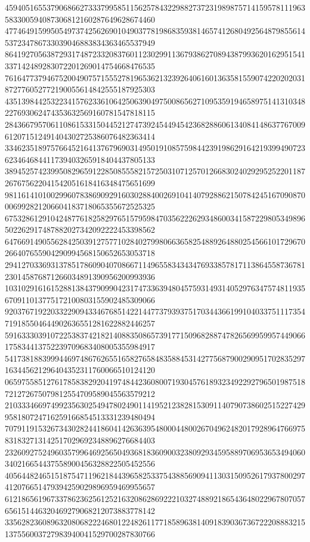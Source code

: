 \begin{DoxyCode}
      459405165537906866273337995851156257843229882737231989875714159578111963583300594087306812160287649628674460
      477464915995054973742562690104903778198683593814657412680492564879855614537234786733039046883834363465537949
      864192705638729317487233208376011230299113679386270894387993620162951541337142489283072201269014754668476535
      761647737946752004907571555278196536213239264061601363581559074220202031872776052772190055614842555187925303
      435139844253223415762336106425063904975008656271095359194658975141310348227693062474353632569160781547818115
      284366795706110861533150445212747392454494542368288606134084148637767009612071512491404302725386076482363414
      334623518975766452164137679690314950191085759844239198629164219399490723623464684411739403265918404437805133
      389452574239950829659122850855582157250310712570126683024029295252201187267675622041542051618416348475651699
      981161410100299607838690929160302884002691041407928862150784245167090870006992821206604183718065355672525325
      675328612910424877618258297651579598470356222629348600341587229805349896502262917487882027342092222453398562
      647669149055628425039127577102840279980663658254889264880254566101729670266407655904290994568150652653053718
      294127033693137851786090407086671149655834343476933857817113864558736781230145876871266034891390956200993936
      103102916161528813843790990423174733639480457593149314052976347574811935670911013775172100803155902485309066
      920376719220332290943346768514221447737939375170344366199104033751117354719185504644902636551281622882446257
      591633303910722538374218214088350865739177150968288747826569959957449066175834413752239709683408005355984917
      541738188399944697486762655165827658483588453142775687900290951702835297163445621296404352311760066510124120
      065975585127617858382920419748442360800719304576189323492292796501987518721272675079812554709589045563579212
      210333466974992356302549478024901141952123828153091140790738602515227429958180724716259166854513331239480494
      707911915326734302824418604142636395480004480026704962482017928964766975831832713142517029692348896276684403
      232609275249603579964692565049368183609003238092934595889706953653494060340216654437558900456328822505452556
      405644824651518754711962184439658253375438856909411303150952617937800297412076651479394259029896959469955657
      612186561967337862362561252163208628692221032748892186543648022967807057656151446320469279068212073883778142
      335628236089632080682224680122482611771858963814091839036736722208883215137556003727983940041529700287830766

\end{DoxyCode}
